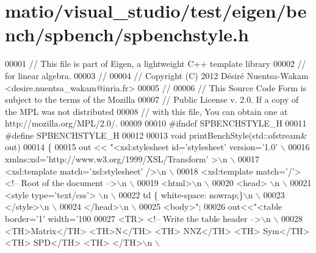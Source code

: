 \hypertarget{matio_2visual__studio_2test_2eigen_2bench_2spbench_2spbenchstyle_8h_source}{}\section{matio/visual\+\_\+studio/test/eigen/bench/spbench/spbenchstyle.h}
\label{matio_2visual__studio_2test_2eigen_2bench_2spbench_2spbenchstyle_8h_source}

\begin{DoxyCode}
00001 \textcolor{comment}{// This file is part of Eigen, a lightweight C++ template library}
00002 \textcolor{comment}{// for linear algebra.}
00003 \textcolor{comment}{//}
00004 \textcolor{comment}{// Copyright (C) 2012 Désiré Nuentsa-Wakam <desire.nuentsa\_wakam@inria.fr>}
00005 \textcolor{comment}{//}
00006 \textcolor{comment}{// This Source Code Form is subject to the terms of the Mozilla}
00007 \textcolor{comment}{// Public License v. 2.0. If a copy of the MPL was not distributed}
00008 \textcolor{comment}{// with this file, You can obtain one at http://mozilla.org/MPL/2.0/.}
00009 
00010 \textcolor{preprocessor}{#ifndef SPBENCHSTYLE\_H}
00011 \textcolor{preprocessor}{#define SPBENCHSTYLE\_H}
00012 
00013 \textcolor{keywordtype}{void} printBenchStyle(std::ofstream& out)
00014 \{
00015   out << \textcolor{stringliteral}{"<xsl:stylesheet id='stylesheet' version='1.0' \(\backslash\)}
00016 \textcolor{stringliteral}{      xmlns:xsl='http://www.w3.org/1999/XSL/Transform' >\(\backslash\)n \(\backslash\)}
00017 \textcolor{stringliteral}{      <xsl:template match='xsl:stylesheet' />\(\backslash\)n \(\backslash\)}
00018 \textcolor{stringliteral}{      <xsl:template match='/'> <!-- Root of the document -->\(\backslash\)n \(\backslash\)}
00019 \textcolor{stringliteral}{      <html>\(\backslash\)n \(\backslash\)}
00020 \textcolor{stringliteral}{        <head> \(\backslash\)n \(\backslash\)}
00021 \textcolor{stringliteral}{          <style type='text/css'> \(\backslash\)n \(\backslash\)}
00022 \textcolor{stringliteral}{            td \{ white-space: nowrap;\}\(\backslash\)n \(\backslash\)}
00023 \textcolor{stringliteral}{          </style>\(\backslash\)n \(\backslash\)}
00024 \textcolor{stringliteral}{        </head>\(\backslash\)n \(\backslash\)}
00025 \textcolor{stringliteral}{        <body>"};
00026   out<<\textcolor{stringliteral}{"<table border='1' width='100%
00027 \textcolor{stringliteral}{        <TR> <!-- Write the table header -->\(\backslash\)n \(\backslash\)}
00028 \textcolor{stringliteral}{        <TH>Matrix</TH> <TH>N</TH> <TH> NNZ</TH>  <TH> Sym</TH>  <TH> SPD</TH> <TH> </TH>\(\backslash\)n \(\backslash\)}
}
\end{DoxyCode}
